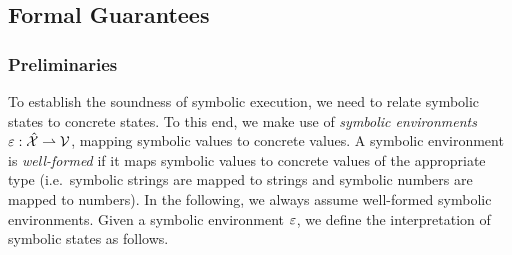 

\subsection{Formal Guarantees}\label{sex:formal:guarantees}

\subsubsection{Preliminaries}
To establish the soundness of symbolic execution, we need to relate 
symbolic states to concrete states. To this end, we make use of \emph{symbolic environments} 
$\varepsilon : \hat{\mathcal{X}} \rightharpoonup \mathcal{V}$, mapping symbolic values to concrete values. 
A symbolic environment is \emph{well-formed} if it maps symbolic 
values to concrete values of the appropriate type (i.e.~symbolic strings are mapped to strings 
and symbolic numbers are mapped to numbers). In the following, we always 
assume well-formed symbolic environments. 
Given a symbolic environment $\varepsilon$, we define the interpretation of symbolic states as follows. 

